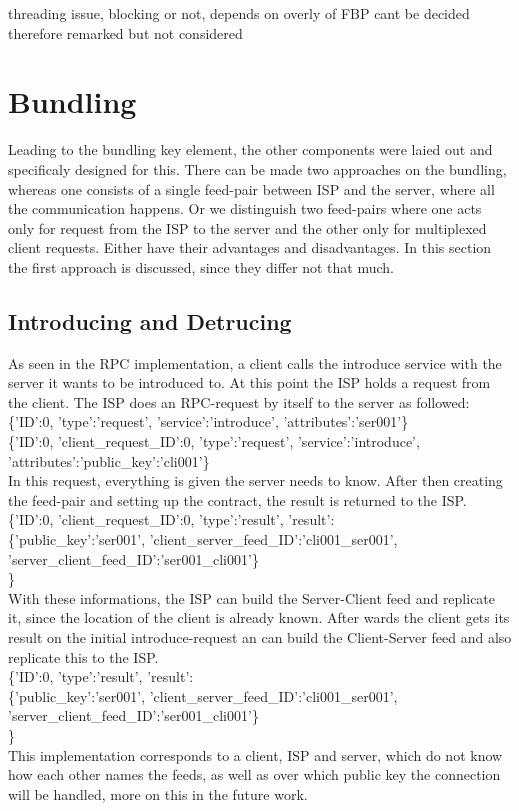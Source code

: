 threading issue, blocking or not, depends on overly of FBP cant be decided therefore remarked but not considered
\section{Bundling}
Leading to the bundling key element, the other components were laied out and specificaly designed for this. There can be made two approaches on the bundling, whereas one consists of a single feed-pair between ISP and the server, where all the communication happens. Or we distinguish two feed-pairs where one acts only for request from the ISP to the server and the other only for multiplexed client requests. Either have their advantages and disadvantages. In this section the first approach is discussed, since they differ not that much.
\subsection{Introducing and Detrucing}
As seen in the RPC implementation, a client calls the introduce service with the server it wants to be introduced to. At this point the ISP holds a request from the client. The ISP does an RPC-request by itself to the server as followed:
\\
\{'ID':0, 'type':'request', 'service':'introduce', 'attributes':'ser001'\}\\
\{'ID':0, 'client\_request\_ID':0, 'type':'request', 'service':'introduce', 'attributes':{'public\_key':'cli001'}\}\\

In this request, everything is given the server needs to know. After then creating the feed-pair and setting up the contract, the result is returned to the ISP.
\\
\{'ID':0, 'client\_request\_ID':0, 'type':'result', 'result':\\\{'public\_key':'ser001', 'client\_server\_feed\_ID':'cli001\_ser001', 'server\_client\_feed\_ID':'ser001\_cli001'\}\\\}\\
With these informations, the ISP can build the Server-Client feed and replicate it, since the location of the client is already known.
After wards the client gets its result on the initial introduce-request an can build the Client-Server feed and also replicate this to the ISP.\\
\{'ID':0, 'type':'result', 'result':\\\{'public\_key':'ser001', 'client\_server\_feed\_ID':'cli001\_ser001', 'server\_client\_feed\_ID':'ser001\_cli001'\}\\\}\\
This implementation corresponds to a client, ISP and server, which do not know how each other names the feeds, as well as over which public key the connection will be handled, more on this in the future work. 

